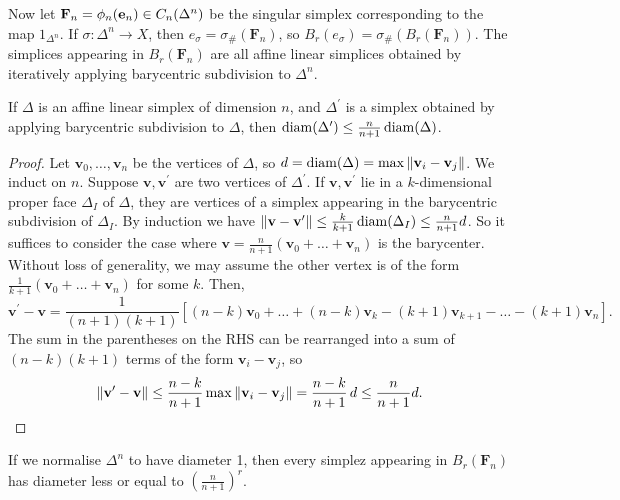 \documentclass[a4paper,11pt]{article}
\begin{document}
				Now let $\textbf{F}_n=\phi_n(\textbf{e}_n)\in\cx[n]{\Delta^n}$ be the singular simplex corresponding to the map $1_{\Delta^n}$. If $\sigma:\Delta^n\rightarrow X$, then $e_\sigma=\sigma_{\#}(\textbf{F}_n)$, so $B_r(e_\sigma)=\sigma_{\#}(B_r(\textbf{F}_n))$. The simplices appearing in $B_r(\textbf{F}_n)$ are all affine linear simplices obtained by iteratively applying barycentric subdivision to $\Delta^n$.

				\begin{lemma}
					If $\Delta$ is an affine linear simplex of dimension $n$, and $\Delta^{\prime}$ is a simplex obtained by applying barycentric subdivision to $\Delta$, then $\diam(\Delta^{\prime})\le \frac{n}{n+1}\diam(\Delta)$.
				\end{lemma}
				\begin{proof}
					Let $\textbf{v}_0,\dots,\textbf{v}_n$ be the vertices of $\Delta$, so $d=\diam(\Delta)=\max\norm{\textbf{v}_i-\textbf{v}_j}$. We induct on $n$. Suppose $\textbf{v},\textbf{v}^{\prime}$ are two vertices of $\Delta^{\prime}$. If $\textbf{v},\textbf{v}^{\prime}$ lie in a $k$-dimensional proper face $\Delta_I$ of $\Delta$, they are vertices of a simplex appearing in the barycentric subdivision of $\Delta_I$. By induction we have $\norm{\textbf{v}-\textbf{v}^{\prime}}\le\frac{k}{k+1}\diam(\Delta_I)\le\frac{n}{n+1}d$. So it suffices to consider the case where $\textbf{v}=\frac{n}{n+1}(\textbf{v}_0+\dots+\textbf{v}_n)$ is the barycenter. Without loss of generality, we may assume the other vertex is of the form $\frac{1}{k+1}(\textbf{v}_0+\dots+\textbf{v}_n)$ for some $k$. Then,
					\begin{equation*}
						\textbf{v}^{\prime}-\textbf{v}=\frac{1}{(n+1)(k+1)}[(n-k)\textbf{v}_0+\dots+(n-k)\textbf{v}_k-(k+1)\textbf{v}_{k+1}-\dots-(k+1)\textbf{v}_{n}].
					\end{equation*} 
					The sum in the parentheses on the RHS can be rearranged into a sum of $(n-k)(k+1)$ terms of the form $\textbf{v}_i-\textbf{v}_j$, so 
					\begin{equation*}
						\norm{\textbf{v}^{\prime}-\textbf{v}}\le\frac{n-k}{n+1}\max\norm{\textbf{v}_i-\textbf{v}_j}=\frac{n-k}{n+1}\,d\le\frac{n}{n+1}d.
					\end{equation*}
				\end{proof}

				\begin{cor}\label{cor--diameter}
					If we normalise $\Delta^n$ to have diameter 1, then every simplez appearing in $B_r(\textbf{F}_n)$ has diameter less or equal to $\left(\frac{n}{n+1}\right)^r$.
				\end{cor}
\end{document}
